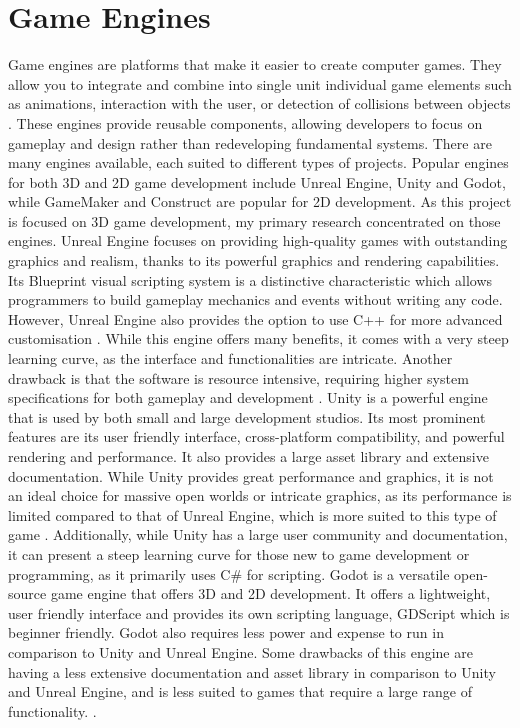 \documentclass[10pt]{final_report}
\begin{document}
\section{Game Engines}
Game engines are platforms that make it easier to create computer games. They allow you to integrate and combine into single unit individual game elements such as animations, interaction with the user, or detection of collisions between objects \cite{Barczak2019}. These engines provide reusable components, allowing developers to focus on gameplay and design rather than redeveloping fundamental systems. There are many engines available, each suited to different types of projects. Popular engines for both 3D and 2D game development include Unreal Engine, Unity and Godot, while GameMaker and Construct are popular for 2D development. As this project is focused on 3D game development, my primary research concentrated on those engines.
\newline
Unreal Engine focuses on providing high-quality games with outstanding graphics and realism, thanks to its powerful graphics and rendering capabilities. Its Blueprint visual scripting system is a distinctive characteristic which allows programmers to build gameplay mechanics and events without writing any code. However, Unreal Engine also provides the option to use C++ for more advanced customisation \cite{eventyr_2023}. While this engine offers many benefits, it comes with a very steep learning curve, as the interface and functionalities are intricate. Another drawback is that the software is resource intensive, requiring higher system specifications for both gameplay and development \cite{eventyr_2023}. 
\newline
Unity is a powerful engine that is used by both small and large development studios. Its most prominent features are its user friendly interface, cross-platform compatibility, and powerful rendering and performance. It also provides a large asset library and extensive documentation. While Unity provides great performance and graphics, it is not an ideal choice for massive open worlds or intricate graphics, as its performance is limited compared to that of Unreal Engine, which is more suited to this type of game \cite{medium_2024}. Additionally, while Unity has a large user community and documentation, it can present a steep learning curve for those new to game development or programming, as it primarily uses C\# for scripting.
\newline
Godot is a versatile open-source game engine that offers 3D and 2D development. It offers a lightweight, user friendly interface and provides its own scripting language, GDScript which is beginner friendly. Godot also requires less power and expense to run in comparison to Unity and Unreal Engine. Some drawbacks of this engine are having a less extensive documentation and asset library in comparison to Unity and Unreal Engine, and is less suited to games that require a large range of functionality. \cite{hatton_2024}. \newline
\end{document}
